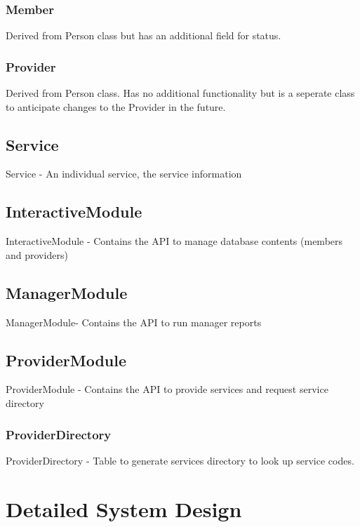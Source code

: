 \documentclass{article}
\begin{document}
\subsubsection{Member}
Derived from Person class but has an additional field for status.
\subsubsection{Provider}
Derived from Person class. Has no additional functionality but is a seperate class to anticipate changes to the Provider in the future.

\subsection{Service}
Service - An individual service, the service information

\subsection{InteractiveModule}
InteractiveModule - Contains the API to manage database contents (members and providers)

\subsection{ManagerModule}
ManagerModule- Contains the API to run manager reports

\subsection{ProviderModule}
ProviderModule - Contains the API to provide services and request service directory
\subsubsection{ProviderDirectory}
ProviderDirectory - Table to generate services directory to look up service codes.

\section{Detailed System Design}
\end{document}
